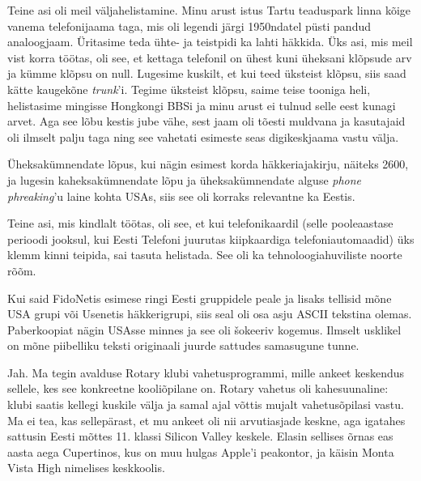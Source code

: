 Teine asi oli meil väljahelistamine. Minu arust istus Tartu 
teaduspark linna kõige vanema telefonijaama taga, mis 
oli legendi järgi 1950ndatel püsti 
pandud analoogjaam. Üritasime teda ühte- ja teistpidi ka lahti 
häkkida. Üks asi, mis meil vist korra töötas, oli see, et kettaga telefonil on ühest kuni üheksani klõpsude arv 
ja kümme klõpsu on null. Lugesime kuskilt, et kui teed üksteist klõpsu, siis 
saad kätte kaugekõne \emph{trunk}'i. Tegime üksteist klõpsu, saime teise tooniga 
heli, helistasime mingisse Hongkongi BBSi ja minu arust ei tulnud selle 
eest kunagi arvet. Aga see lõbu kestis jube vähe, sest jaam oli tõesti 
muldvana ja kasutajaid oli ilmselt palju taga ning see vahetati esimeste seas 
digikeskjaama vastu välja. 

Üheksakümnendate lõpus, kui nägin esimest korda 
häkkeriajakirju, näiteks 2600, ja lugesin 
kaheksakümnendate lõpu ja üheksakümnendate alguse \emph{phone phreaking}'u laine 
kohta USAs, siis see oli korraks relevantne ka Eestis. 

Teine asi, mis kindlalt töötas, oli see, et kui telefonikaardil (selle 
pooleaastase perioodi jooksul, kui Eesti Telefoni juurutas kiipkaardiga 
telefoniautomaadid) üks klemm 
kinni teipida, sai tasuta helistada. See oli ka tehnoloogiahuviliste 
noorte rõõm.


Kui said FidoNetis esimese ringi Eesti gruppidele peale ja 
lisaks tellisid mõne USA grupi või Usenetis häkkerigrupi, siis 
seal oli osa asju ASCII tekstina olemas. Paberkoopiat nägin 
USAsse minnes ja see oli šokeeriv kogemus. Ilmselt usklikel 
on mõne piibelliku teksti originaali 
juurde sattudes samasugune tunne. 


Jah. Ma tegin avalduse Rotary klubi vahetusprogrammi, mille 
ankeet keskendus sellele, kes see konkreetne kooliõpilane on. Rotary 
vahetus oli kahesuunaline: klubi saatis kellegi kuskile välja ja 
samal ajal võttis mujalt vahetusõpilasi vastu. 
Ma ei tea, kas sellepärast, et mu ankeet oli nii arvutiasjade 
keskne, aga igatahes sattusin Eesti mõttes 11. klassi Silicon Valley keskele. Elasin
sellises õrnas eas aasta aega Cupertinos, kus on muu hulgas 
Apple'i peakontor, ja käisin Monta Vista High nimelises keskkoolis. 

